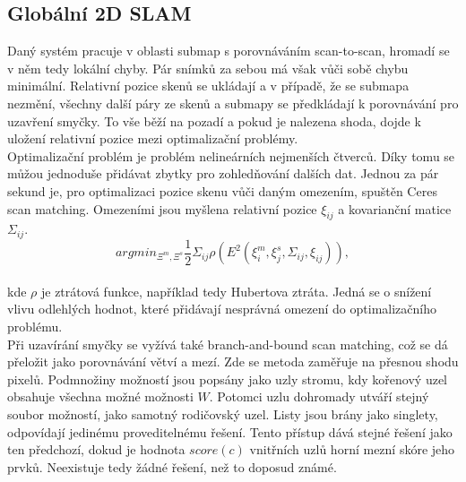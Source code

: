 \documentclass[12pt]{report}
\begin{document}
\subsection{Globální 2D SLAM}
Daný systém pracuje v oblasti submap s porovnáváním scan-to-scan, hromadí se v něm tedy lokální chyby. Pár snímků za sebou má však vůči sobě chybu minimální. Relativní pozice skenů se ukládají a v případě, že se submapa nezmění, všechny další páry ze skenů a submapy se předkládají k porovnávání pro uzavření smyčky. To vše běží na pozadí a pokud je nalezena shoda, dojde k uložení relativní pozice mezi optimalizační problémy.\\
\indent Optimalizační problém je problém nelineárních nejmenších čtverců. Díky tomu se můžou jednoduše přidávat zbytky pro zohledňování dalších dat. Jednou za pár sekund je, pro optimalizaci pozice skenu vůči daným omezením, spuštěn Ceres scan matching. Omezeními jsou myšlena relativní pozice $\xi_{ij}$ a kovarianční matice $\Sigma_{ij}$.
\begin{equation}
argmin_{\Xi^m,\Xi^s}\frac{1}{2}\Sigma_{ij}\rho(E^2(\xi_i^m,\xi_j^s,\Sigma_{ij},\xi_{ij})),
\end{equation}\\
kde $\rho$ je ztrátová funkce, například tedy Hubertova ztráta. Jedná se o snížení vlivu odlehlých hodnot, které přidávají nesprávná omezení do optimalizačního problému.\\
\indent Při uzavírání smyčky se vyžívá také branch-and-bound scan matching, což se dá přeložit jako porovnávání větví a mezí. Zde se metoda zaměřuje na přesnou shodu pixelů. Podmnožiny možností jsou popsány jako uzly stromu, kdy kořenový uzel obsahuje všechna možné možnosti $W$. Potomci uzlu dohromady utváří stejný soubor možností, jako samotný rodičovský uzel. Listy jsou brány jako singlety, odpovídají jedinému proveditelnému řešení. Tento přístup dává stejné řešení jako ten předchozí, dokud je hodnota $score(c)$ vnitřních uzlů horní mezní skóre jeho prvků. Neexistuje tedy žádné řešení, než to doposud známé.
\end{document}

